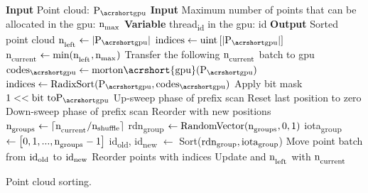 \begin{algorithm}
  \small
  \begin{algorithmic}[1]
    \State \textbf{Input} Point cloud: $\Points$ %
    \State \textbf{Input} Maximum number of points that can be allocated in the \acrshort{gpu}: $\textrm{n}_\textsubscript{max}$ %
    \State \textbf{Variable} \textrm{thread}\textsubscript{id} in the \acrshort{gpu}: id %
    \State \textbf{Output} Sorted point cloud %
    \State $\LeftPoints \gets \PCCardinality$ %
    \State $\textrm{indices} \gets \textrm{uint}\left[\PCCardinality\right]$ %
        \State $\textrm{n}_\textsubscript{current} \gets \textrm{min}(\textrm{n}_\textsubscript{left}, \textrm{n}_\textsubscript{max})$ %
        \State Transfer the following $\textrm{n}_\textsubscript{current}$ batch to \acrshort{gpu} %
            \State $\Codes \gets \textrm{morton\acrshort{gpu}}(\Points)$ %
            \State $\textrm{indices} \gets \textrm{RadixSort}(\Points, \Codes)$ %
                    \State Apply bit mask $1 << \textrm{bit to} \Points$ %
                    \State Up-sweep phase of prefix scan %
                    \State Reset last position to zero %
                    \State Down-sweep phase of prefix scan %
                    \State Reorder \Points with new positions %
                \EndFor
            \EndProcedure
        \EndProcedure
                \State $\textrm{n}_\textsubscript{groups} \gets \lceil \textrm{n}_\textsubscript{current} / \textrm{n}\textsubscript{shuffle} \rceil$ %
                \State rdn\textsubscript{group} $\gets \textrm{RandomVector}(\textrm{n}_\textsubscript{groups}, 0, 1)$ %
                \State iota\textsubscript{group} $\gets \bigl[0, 1, ..., \textrm{n}_\textsubscript{groups}-1 \bigr]$ %
                \State id\textsubscript{old}, id\textsubscript{new} $\gets$ Sort($\textrm{rdn\textsubscript{group}}, \textrm{iota}\textsubscript{group}$) %
                    \State Move point batch from $\textrm{id}\textsubscript{old}$ to $\textrm{id}\textsubscript{new}$ %
                \EndFor
            \Else
                \State Reorder points with indices %
            \EndIf
        \EndProcedure
        \State Update \Points \Space and $\textrm{n}_\textsubscript{left}$ with $\textrm{n}_\textsubscript{current}$ %
    \EndWhile
    \caption{Point cloud sorting.}
    \label{alg:sorting}
  \end{algorithmic}
  \normalsize
\end{algorithm}

